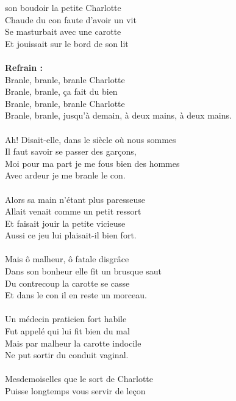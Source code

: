 \vspace{-0.3cm}
 son boudoir la petite Charlotte
\\Chaude du con faute d'avoir un vit
\\Se masturbait avec une carotte
\\Et jouissait sur le bord de son lit
\\\\\textbf{Refrain :}
\\Branle, branle, branle Charlotte
\\Branle, branle, ça fait du bien
\\Branle, branle, branle Charlotte
\\Branle, branle, jusqu'à demain, à deux mains, à deux mains.
\\\\Ah! Disait-elle, dans le siècle où nous sommes
\\Il faut savoir se passer des garçons,
\\Moi pour ma part je me fous bien des hommes
\\Avec ardeur je me branle le con.
\\\\Alors sa main n'étant plus paresseuse
\\Allait venait comme un petit ressort
\\Et faisait jouir la petite vicieuse
\\Aussi ce jeu lui plaisait-il bien fort.
\\\\Mais ô malheur, ô fatale disgrâce
\\Dans son bonheur elle fit un brusque saut
\\Du contrecoup la carotte se casse
\\Et dans le con il en reste un morceau.
\\\\Un médecin praticien fort habile
\\Fut appelé qui lui fit bien du mal
\\Mais par malheur la carotte indocile
\\Ne put sortir du conduit vaginal.
\\\\Mesdemoiselles que le sort de Charlotte
\\Puisse longtemps vous servir de leçon
